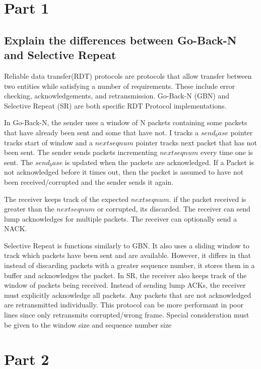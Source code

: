 \documentclass{assignment-x}
\begin{document}
\maketitle
\pagebreak


\section{Part 1}
\subsection{Explain the differences between Go-Back-N and Selective Repeat}
Reliable data transfer(RDT) protocols are protocols that allow transfer between two entities while satisfying a number of requirements. These include error checking, acknowledgements, and retransmission. Go-Back-N (GBN) and Selective Repeat (SR) are both specific RDT Protocol implementations. 

In Go-Back-N, the sender uses a window of N packets containing some packets that have already been sent and some that have not. I tracks a $send_base$ pointer tracks start of window and a $nextseqnum$ pointer tracks next packet that has not been sent. The sender sends packets incrementing $nextseqnum$ every time one is sent. The $send_base$ is updated when the packets are acknowledged.
If a Packet is not acknowledged before it times out, then the packet is assumed to have not been received/corrupted and the sender sends it again. 

The receiver keeps track of the expected $nextseqnum$. if the packet received is greater than the $nextseqnum$ or corrupted, its discarded. The receiver can send lump acknowledges for multiple packets. The receiver can optionally send a NACK.

Selective Repeat is functions similarly to GBN. It also uses a sliding window to track which packets have been sent and are available. However, it differs in that instead of discarding packets with a greater sequence number, it stores them in a buffer and acknowledges the packet. In SR, the receiver also keeps track of the window of packets being received. Instead of sending lump ACKs, the receiver must explicitly acknowledge all packets. Any packets that are not acknowledged are retransmitted individually.  This protocol can be more performant in poor lines since only retransmits corrupted/wrong frame. Special consideration must be given to the window size and sequence number size

\section{Part 2}
\end{document}
